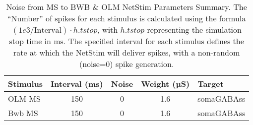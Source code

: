 \begin{table}[htbp]
    \centering
    \caption[Noise from MS to BWB \& OLM Parameters]{Noise from MS to BWB \& OLM NetStim Parameters Summary.
        The ``Number'' of spikes for each stimulus is calculated using the formula \((1e3 / \text{Interval}) \cdot h.tstop\),
        with \(h.tstop\) representing the simulation stop time in ms.
        The specified interval for each stimulus defines the rate at which the NetStim will deliver spikes,
        with a non-random (noise=0) spike generation.}
    \begin{tabular}{lcccl}
        \hline
        \textbf{Stimulus} & \textbf{Interval (ms)} & \textbf{Noise} & \textbf{Weight (µS)} & \textbf{Target} \\
        \hline
        OLM MS            & 150                    & 0              & 1.6                  & somaGABAss      \\
        Bwb MS            & 150                    & 0              & 1.6                  & somaGABAss      \\
        \hline
    \end{tabular}
\end{table}\label{tab:noise_from_MS_to_BWB_OLM}
